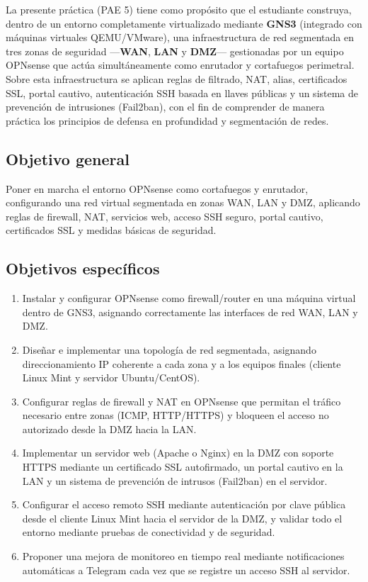 \documentclass{article}
\providecommand{\tightlist}{%
  \setlength{\itemsep}{0pt}\setlength{\parskip}{0pt}}
\renewcommand{\_}{\oldunderscore\hskip0pt\relax}
\begin{document}
La presente práctica (PAE 5) tiene como propósito que el estudiante
construya, dentro de un entorno completamente virtualizado mediante
\textbf{GNS3} (integrado con máquinas virtuales QEMU/VMware), una
infraestructura de red segmentada en tres zonas de seguridad
---\textbf{WAN}, \textbf{LAN} y \textbf{DMZ}--- gestionadas por un
equipo OPNsense que actúa simultáneamente como enrutador y cortafuegos
perimetral. Sobre esta infraestructura se aplican reglas de filtrado,
NAT, alias, certificados SSL, portal cautivo, autenticación SSH basada
en llaves públicas y un sistema de prevención de intrusiones (Fail2ban),
con el fin de comprender de manera práctica los principios de defensa en
profundidad y segmentación de redes.

\hypertarget{objetivo-general}{%
\subsection{Objetivo general}\label{objetivo-general}}

Poner en marcha el entorno OPNsense como cortafuegos y enrutador,
configurando una red virtual segmentada en zonas WAN, LAN y DMZ,
aplicando reglas de firewall, NAT, servicios web, acceso SSH seguro,
portal cautivo, certificados SSL y medidas básicas de seguridad.

\hypertarget{objetivos-especuxedficos}{%
\subsection{Objetivos específicos}\label{objetivos-especuxedficos}}

\begin{enumerate}
\def\labelenumi{\arabic{enumi}.}
\tightlist
\item
  Instalar y configurar OPNsense como firewall/router en una máquina
  virtual dentro de GNS3, asignando correctamente las interfaces de red
  WAN, LAN y DMZ.
\item
  Diseñar e implementar una topología de red segmentada, asignando
  direccionamiento IP coherente a cada zona y a los equipos finales
  (cliente Linux Mint y servidor Ubuntu/CentOS).
\item
  Configurar reglas de firewall y NAT en OPNsense que permitan el
  tráfico necesario entre zonas (ICMP, HTTP/HTTPS) y bloqueen el acceso
  no autorizado desde la DMZ hacia la LAN.
\item
  Implementar un servidor web (Apache o Nginx) en la DMZ con soporte
  HTTPS mediante un certificado SSL autofirmado, un portal cautivo en la
  LAN y un sistema de prevención de intrusos (Fail2ban) en el servidor.
\item
  Configurar el acceso remoto SSH mediante autenticación por clave
  pública desde el cliente Linux Mint hacia el servidor de la DMZ, y
  validar todo el entorno mediante pruebas de conectividad y de
  seguridad.
\item
  Proponer una mejora de monitoreo en tiempo real mediante
  notificaciones automáticas a Telegram cada vez que se registre un
  acceso SSH al servidor.
\end{enumerate}
\end{document}
